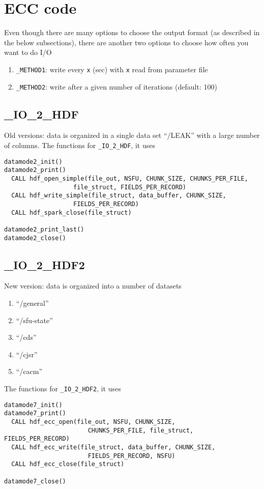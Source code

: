\section{ECC code}
\label{sec:IO_ecc}

Even though there are many options to choose the output format (as
described in the below subsections), there are another two options to choose how
often you want to do I/O
\begin{enumerate}
  \item \verb!_METHOD1!: write every \verb!x! (sec) with \verb!x! read from
  parameter file
  \item \verb!_METHOD2!: write after a given number of iterations (default: 100)
\end{enumerate}

\subsection{\_IO\_2\_HDF}
\label{sec:ECC_HDF}

Old versions: data is organized in a single data set ``/LEAK'' with a large
number of columns. The functions for \verb!_IO_2_HDF!, it uses
\begin{verbatim}
datamode2_init()
datamode2_print()
  CALL hdf_open_simple(file_out, NSFU, CHUNK_SIZE, CHUNKS_PER_FILE, 
                   file_struct, FIELDS_PER_RECORD)
  CALL hdf_write_simple(file_struct, data_buffer, CHUNK_SIZE, 
                   FIELDS_PER_RECORD)
  CALL hdf_spark_close(file_struct)

datamode2_print_last()       
datamode2_close()
\end{verbatim}

\subsection{\_IO\_2\_HDF2}
\label{sec:ECC_HDF2}

New version: data is organized into a number of datasets
\begin{enumerate}
  \item ``/general''
  \item ``/sfu-state''
  \item ``/cds''
  \item ``/cjsr''
  \item ``/cacm''
\end{enumerate}
The functions for \verb!_IO_2_HDF2!, it uses
\begin{verbatim} 
datamode7_init()
datamode7_print()
  CALL hdf_ecc_open(file_out, NSFU, CHUNK_SIZE, 
                       CHUNKS_PER_FILE, file_struct, FIELDS_PER_RECORD)
  CALL hdf_ecc_write(file_struct, data_buffer, CHUNK_SIZE, 
                       FIELDS_PER_RECORD, NSFU)
  CALL hdf_ecc_close(file_struct)

datamode7_close()
\end{verbatim}



